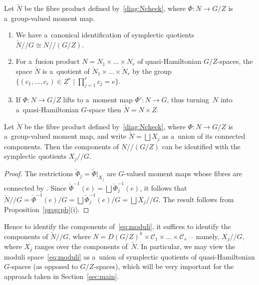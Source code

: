 \begin{Proposition}
\label{prop:pb}
Let $\check{N}$ be the fibre product defined by~\eqref{diag:Ncheck}, where $\Phi:N\to G/Z$ is a~group-valued moment map.

\begin{enumerate}\itemsep=0pt
\item[$i)$]
We have a~canonical identification of symplectic quotients $\check{N}/ / G \cong N/ / (G/Z)$.
\item[$ii)$]
For a~fusion product $N={N}_1\times \dots \times {N}_r$ of quasi-Hamiltonian ${G/Z}$-spaces, the space $\check{N}$ is
a~quotient of $\check{N}_1\times\dots \times \check{N}_r$ by the group $\big\{(c_1,\ldots,c_r)\in Z^r \mid \prod\limits_{j=1}^r c_j=e\big\}$.
\item[$iii)$]
If $\Phi\colon N\to G/Z$ lifts to a~moment map $\Phi'\colon N\to {G}$, thus turning~$N$ into a~quasi-Hamiltonian
${G}$-space   then $ \check{N}=N\times Z$.
\end{enumerate}
\end{Proposition}

\begin{Corollary}
\label{cor:comps}
Let $\check{N}$ be the fibre product defined by~\eqref{diag:Ncheck}, where $\Phi:N\to G/Z$ is a~group-valued moment
map, and write $\check{N}=\bigsqcup X_j$ as a~union of its connected components.
Then the components of $N/ /(G/Z)$ can be identified with the symplectic quotients $X_j/ /G$.
\end{Corollary}

\begin{proof}
The restrictions $\check{\Phi}_j=\check{\Phi}|_{X_j}$ are $G$-valued moment maps whose f\/ibres are connected by \cite[Theorem~7.2]{AMM}.
Since $\check{\Phi}^{-1}(e) = \bigsqcup \check{\Phi}_j^{-1}(e)$, it follows that $\check{N}/ /G = \check{\Phi}^{-1}(e)/G
= \bigsqcup \check{\Phi}_j^{-1}(e)/G=\bigsqcup X_j/ /G$.
The result follows from Proposition~\ref{prop:pb}(i). %
\end{proof}

Hence to identify the components of~\eqref{eq:moduli}, it suf\/f\/ices to identify the components of $\check{N} / /G$, where
$N= D(G/Z)^h\times\mathcal{C}_1 \times \dots \times \mathcal{C}_s $~-- namely, $X_j/ /G$, where $X_j$ ranges over the
components of~$\check{N}$.
In particular, we may view the moduli space~\eqref{eq:moduli} as a~union of symplectic quotients of
quasi-Hamiltonian $G$-spaces (as opposed to $G/Z$-spaces), which will be very important for the approach taken in
Section~\ref{sec:main}.

